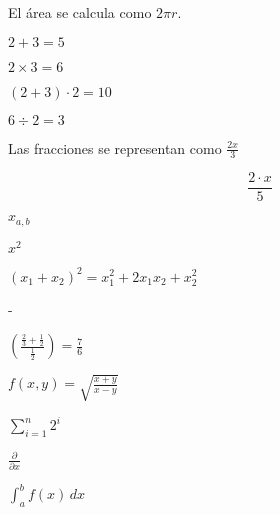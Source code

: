 \documentclass{article}
\begin{document}
El \'area se calcula como $2 \pi r$.

$2 + 3 = 5$

$2 \times 3 = 6$

$(2+3) \cdot 2 = 10$

$6 \div 2 = 3$

Las fracciones se representan como $\frac{2x}{3}$

\begin{equation}
\frac{2 \cdot x}{5}
\end{equation}

$x_{a,b}$

$x^2$

$(x_{1}+x_{2})^2=x_{1}^{2}+2x_{1}x_{2}+x_{2}^{2}$

-

$\left(\frac{\frac{2}{3}+\frac{1}{2}}{\frac{1}{2}}\right)=\frac{7}{6}$

$f(x,y)=\sqrt{\frac{x+y}{x-y}}$

$\sum_{i=1}^{n}{2^i}$

$\frac{\partial }{\partial x}$

$\int_{a}^{b} \! f(x)  \,dx$
\end{document}
